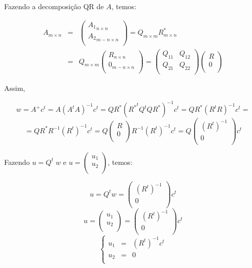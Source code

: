 Fazendo a decomposição QR de $A$, temos:

\begin{eqnarray*}
A_{m \times n} &=& \left(
\begin{array}{l}
{A_1}_{n \times n} \\
{A_2}_{m-n \times n} \\
\end{array} \right) =
Q_{m \times m} R^{*}_{m \times n} \\
&=&
Q_{m \times m} \left(
\begin{array}{l}
R_{n \times n}\\
0_{m-n \times n} \\
\end{array}
\right)
= \left(
\begin{array}{ll}
Q_{11} & Q_{12} \\
Q_{21} & Q_{22} \\
\end{array}
\right)
\left(
\begin{array}{c}
R\\
0 \\
\end{array}
\right)
\end{eqnarray*}

Assim,

$$
w = A^{+} c^t = A \left( A^t A \right)^{-1} c^t = Q R^{*} \left( {R^{*}}^t Q^t Q R^{*} \right)^{-1} c^t = Q R^{*} \left( R^t R \right)^{-1} c^t =
$$
$$
= Q R^{*} R^{-1} {(R^t)}^{-1} c^t = Q \left(
\begin{array}{l}
R \\
0 \\
\end{array}
\right)
 R^{-1} {(R^t)}^{-1} c^t =
 Q \left(
\begin{array}{l}
 {(R^t)}^{-1}  \\
0 \\
\end{array}
\right) c^t
$$

\noindent Fazendo $u = Q^t \; w$ e $u = \left( \begin{array}{c} u_1 \\ u_2 \\
\end{array} \right)$, temos:

$$
u = Q^t w =
\left(
\begin{array}{l}
 {(R^t)}^{-1}  \\
0 \\
\end{array}
\right) c^t
$$
$$
u = \left( \begin{array}{c} u_1 \\ u_2 \\ \end{array} \right) = \left(
\begin{array}{l}
 {(R^t)}^{-1}  \\
0 \\
\end{array}
\right)
c^t
$$
$$
\left\{ \begin{array}{lll}
u_1 & = & (R^t)^{-1} c^t \\
u_2 & = & 0 \\
\end{array}
\right.
$$

